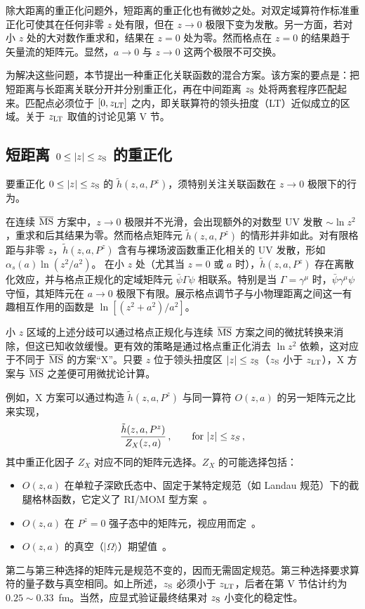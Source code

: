 除大距离的重正化问题外，短距离的重正化也有微妙之处。对双定域算符作标准重正化可使其在任何非零 $z$ 处有限，但在 $z\to 0$ 极限下变为发散。另一方面，若对小 $z$ 处的大对数作重求和，结果在 $z=0$ 处为零。然而格点在 $z=0$ 的结果趋于矢量流的矩阵元。显然，$a\to 0$ 与 $z\to 0$ 这两个极限不可交换。

为解决这些问题，本节提出一种重正化关联函数的混合方案。该方案的要点是：把短距离与长距离关联分开并分别重正化，再在中间距离 $z_{\rm S}$ 处将两套程序匹配起来。匹配点必须位于 $[0,z_{\rm LT}]$ 之内，即关联算符的领头扭度（LT）近似成立的区域。关于 $z_{\rm LT}$ 取值的讨论见第 V 节。

\subsection{短距离 $0\le |z|\le z_{\rm S}$ 的重正化}
\label{sec:short}

要重正化 $0\le |z|\le z_{\rm S}$ 的 $\tilde h(z,a, P^z)$，须特别关注关联函数在 $z\to 0$ 极限下的行为。

在连续 ${\overline{\rm MS}}$ 方案中，$z\rightarrow 0$ 极限并不光滑，会出现额外的对数型 UV 发散 $\sim \ln z^2$，重求和后其结果为零。然而格点矩阵元 $\tilde h(z,a, P^z)$ 的情形并非如此。对有限格距与非零 $z$，$\tilde h(z,a, P^z)$ 含有与裸场波函数重正化相关的 UV 发散，形如
$\alpha_s(a)\ln (z^2/a^2)$。
在小 $z$ 处（尤其当 $z=0$ 或 $a$ 时），$\tilde h(z,a, P^z)$ 存在离散化效应，并与格点正规化的定域矩阵元 ${\bar\psi}\Gamma \psi$ 相联系。特别是当 $\Gamma=\gamma^\mu$ 时，${\bar\psi}\gamma^\mu \psi$ 守恒，其矩阵元在 $a\to 0$ 极限下有限。展示格点调节子与小物理距离之间这一有趣相互作用的函数是 $\ln [(z^2+a^2)/a^2]$。

小 $z$ 区域的上述分歧可以通过格点正规化与连续 ${\overline{\rm MS}}$ 方案之间的微扰转换来消除，但这已知收敛缓慢。更有效的策略是通过格点重正化消去 $\ln z^2$ 依赖，这对应于不同于 ${\overline{\rm MS}}$ 的方案``X''。只要 $z$ 位于领头扭度区 $|z|\le z_{\rm S}$（$z_{\rm S}$ 小于 $z_{\rm LT}$），X 方案与 ${\overline{\rm MS}}$ 之差便可用微扰论计算。

例如，X 方案可以通过构造 $\tilde h(z,a, P^z)$ 与同一算符 $O(z,a)$ 的另一矩阵元之比来实现，
\begin{align}\label{eq:ratio}
 \frac{\tilde h(z,a,P^z)}{Z_X(z,a)}\,,~~~~~~{\rm for\ }|z|\le z_{S}\,,
\end{align}
其中重正化因子 $Z_X$ 对应不同的矩阵元选择。$Z_X$ 的可能选择包括：
\begin{itemize}
\item{$O(z,a)$ 在单粒子深欧氏态中、固定于某特定规范（如 Landau 规范）下的截腿格林函数，它定义了 RI/MOM 型方案~\cite{Constantinou:2017sej,Stewart:2017tvs,Alexandrou:2017huk,Chen:2017mzz}。}
\item{$O(z,a)$ 在 $P^z=0$ 强子态中的矩阵元，视应用而定~\cite{Radyushkin:2017cyf,Orginos:2017kos}。}
\item{$O(z,a)$ 的真空（$|\Omega\rangle$）期望值~\cite{Braun:2018brg,Li:2020xml}。}
\end{itemize}
第二与第三种选择的矩阵元是规范不变的，因而无需固定规范。第三种选择要求算符的量子数与真空相同。如上所述，$z_{\rm S}$ 必须小于 $z_{\rm LT}$，后者在第 V 节估计约为
$0.25 \sim 0.33$~fm。当然，应显式验证最终结果对 $z_{\rm S}$ 小变化的稳定性。

